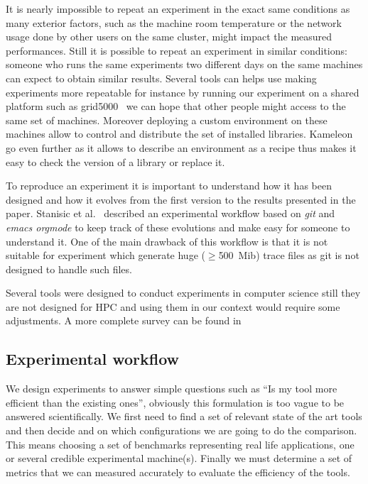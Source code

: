 It is nearly impossible to repeat an experiment in the exact same conditions
as many exterior factors, such as the machine room temperature or the network
usage done by other users   on the same cluster, might impact the measured
performances.
Still it is possible to repeat an experiment in similar conditions: someone
who runs the same experiments two different days on the same machines can
expect to obtain similar results. Several tools can helps use making
experiments more repeatable for instance by running our experiment on a shared
platform such as grid5000~\cite{Cappello05Grid5000} we can hope that other
people might access to the same set of machines. Moreover deploying a custom
environment on these machines allow to control and distribute the set of
installed libraries. Kameleon~\cite{Ruiz15Reconstructable} go even
further as it allows to describe an environment as a recipe thus makes it easy
to check the version of a library or replace it.

To reproduce an experiment it is important to understand how it has been
designed and how it evolves from the first version to the results presented in
the paper. Stanisic et al.~\cite[Chapter~4, p31-44]{Stanisic15Reproducible}
described an experimental workflow based on \emph{git} and \emph{emacs orgmode}
to keep track of these evolutions and make easy for someone to understand it.
One of the main drawback of this workflow is that it is not suitable for
experiment which generate huge ($\ge$\SI{500}{Mib}) trace files as git is not
designed to handle such files.

Several tools were designed to conduct experiments in computer science still
they are not designed for \gls{HPC} and using them in our context would
require some adjustments. A more complete survey can be found
in~\cite[Chapter~3, p17-19]{Stanisic15Reproducible}

\subsection{Experimental workflow}

We design experiments to answer simple questions such as ``Is my tool more
efficient than the existing ones'', obviously this formulation is too vague to
be answered scientifically. We first need to find a set of relevant state of
the art tools and then decide and on which configurations we are going to do
the comparison. This means choosing a set of benchmarks representing real life
applications, one or several credible experimental machine(s). Finally we must
determine a set of metrics that we can measured accurately to evaluate the
efficiency of the tools.

